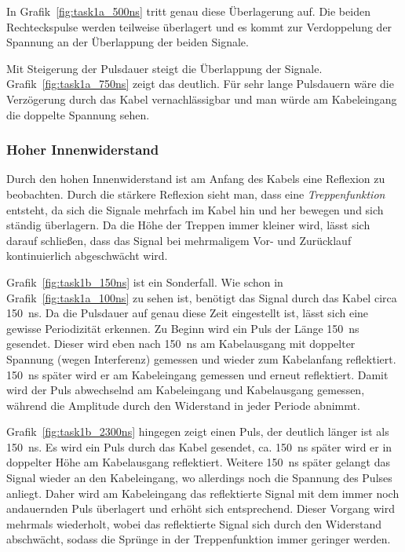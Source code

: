 \documentclass{article}
\begin{document}
In Grafik~\ref{fig:task1a_500ns} tritt genau diese Überlagerung auf. Die beiden Rechteckspulse werden teilweise überlagert und es kommt zur Verdoppelung der Spannung an der Überlappung der beiden Signale.

Mit Steigerung der Pulsdauer steigt die Überlappung der Signale. Grafik~\ref{fig:task1a_750ns} zeigt das deutlich. Für sehr lange Pulsdauern wäre die Verzögerung durch das Kabel vernachlässigbar und man würde am Kabeleingang die doppelte Spannung sehen.


\subsubsection{Hoher Innenwiderstand}

Durch den hohen Innenwiderstand ist am Anfang des Kabels eine Reflexion zu beobachten. Durch die stärkere Reflexion sieht man, dass eine \textit{Treppenfunktion} entsteht, da sich die Signale mehrfach im Kabel hin und her bewegen und sich ständig überlagern. Da die Höhe der Treppen immer kleiner wird, lässt sich darauf schließen, dass das Signal bei mehrmaligem Vor- und Zurücklauf kontinuierlich abgeschwächt wird.

Grafik~\ref{fig:task1b_150ns} ist ein Sonderfall. Wie schon in Grafik~\ref{fig:task1a_100ns} zu sehen ist, benötigt das Signal durch das Kabel circa 150~ns. Da die Pulsdauer auf genau diese Zeit eingestellt ist, lässt sich eine gewisse Periodizität erkennen. Zu Beginn wird ein Puls der Länge 150~ns gesendet. Dieser wird eben nach 150~ns am Kabelausgang mit doppelter Spannung (wegen Interferenz) gemessen und wieder zum Kabelanfang reflektiert. 150~ns später wird er am Kabeleingang gemessen und erneut reflektiert. Damit wird der Puls abwechselnd am Kabeleingang und Kabelausgang gemessen, während die Amplitude durch den Widerstand in jeder Periode abnimmt.

Grafik~\ref{fig:task1b_2300ns} hingegen zeigt einen Puls, der deutlich länger ist als 150~ns. Es wird ein Puls durch das Kabel gesendet, ca. 150~ns später wird er in doppelter Höhe am Kabelausgang reflektiert. Weitere 150~ns später gelangt das Signal wieder an den Kabeleingang, wo allerdings noch die Spannung des Pulses anliegt. Daher wird am Kabeleingang das reflektierte Signal mit dem immer noch andauernden Puls überlagert und erhöht sich entsprechend. Dieser Vorgang wird mehrmals wiederholt, wobei das reflektierte Signal sich durch den Widerstand abschwächt, sodass die Sprünge in der Treppenfunktion immer geringer werden. 
\end{document}
